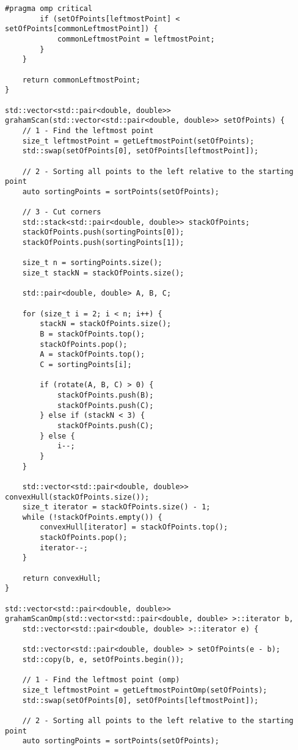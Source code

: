 \documentclass{report}
\begin{document}
\begin{lstlisting}
#pragma omp critical
        if (setOfPoints[leftmostPoint] < setOfPoints[commonLeftmostPoint]) {
            commonLeftmostPoint = leftmostPoint;
        }
    }

    return commonLeftmostPoint;
}

std::vector<std::pair<double, double>>
grahamScan(std::vector<std::pair<double, double>> setOfPoints) {
    // 1 - Find the leftmost point
    size_t leftmostPoint = getLeftmostPoint(setOfPoints);
    std::swap(setOfPoints[0], setOfPoints[leftmostPoint]);

    // 2 - Sorting all points to the left relative to the starting point
    auto sortingPoints = sortPoints(setOfPoints);

    // 3 - Cut corners
    std::stack<std::pair<double, double>> stackOfPoints;
    stackOfPoints.push(sortingPoints[0]);
    stackOfPoints.push(sortingPoints[1]);

    size_t n = sortingPoints.size();
    size_t stackN = stackOfPoints.size();

    std::pair<double, double> A, B, C;

    for (size_t i = 2; i < n; i++) {
        stackN = stackOfPoints.size();
        B = stackOfPoints.top();
        stackOfPoints.pop();
        A = stackOfPoints.top();
        C = sortingPoints[i];

        if (rotate(A, B, C) > 0) {
            stackOfPoints.push(B);
            stackOfPoints.push(C);
        } else if (stackN < 3) {
            stackOfPoints.push(C);
        } else {
            i--;
        }
    }

    std::vector<std::pair<double, double>> convexHull(stackOfPoints.size());
    size_t iterator = stackOfPoints.size() - 1;
    while (!stackOfPoints.empty()) {
        convexHull[iterator] = stackOfPoints.top();
        stackOfPoints.pop();
        iterator--;
    }

    return convexHull;
}

std::vector<std::pair<double, double>>
grahamScanOmp(std::vector<std::pair<double, double> >::iterator b,
    std::vector<std::pair<double, double> >::iterator e) {

    std::vector<std::pair<double, double> > setOfPoints(e - b);
    std::copy(b, e, setOfPoints.begin());

    // 1 - Find the leftmost point (omp)
    size_t leftmostPoint = getLeftmostPointOmp(setOfPoints);
    std::swap(setOfPoints[0], setOfPoints[leftmostPoint]);

    // 2 - Sorting all points to the left relative to the starting point
    auto sortingPoints = sortPoints(setOfPoints);


\end{lstlisting}
\end{document}
